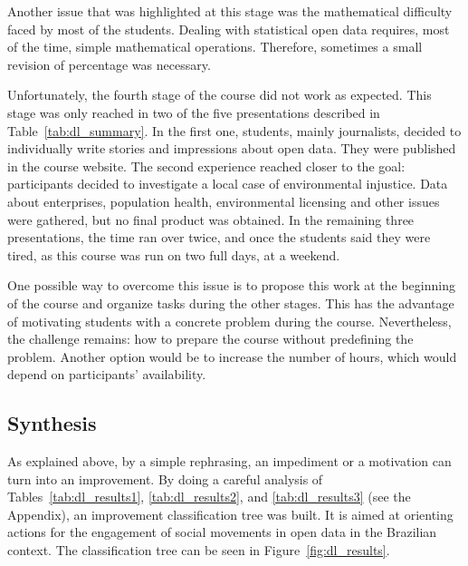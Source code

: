Another issue that was highlighted at this stage was the mathematical difficulty faced by most of the students. Dealing with statistical open data requires, most of the time, simple mathematical operations. Therefore, sometimes a small revision of percentage was necessary.

Unfortunately, the fourth stage of the course did not work as expected. This stage was only reached in two of the five presentations described in Table~\ref{tab:dl_summary}. In the first one, students, mainly journalists, decided to individually write stories and impressions about open data. They were published in the course website. The second experience reached closer to the goal: participants decided to investigate a local case of environmental injustice. Data about enterprises, population health, environmental licensing and other issues were gathered, but no final product was obtained. In the remaining three presentations, the time ran over twice, and once the students said they were tired, as this course was run on two full days, at a weekend.

One possible way to overcome this issue is to propose this work at the beginning of the course and organize tasks during the other stages. This has the advantage of motivating students with a concrete problem during the course. Nevertheless, the challenge remains: how to prepare the course without predefining the problem. Another option would be to increase the number of hours, which would depend on participants' availability.

\subsection{Synthesis}

As explained above, by a simple rephrasing, an impediment or a motivation can turn into an improvement. By doing a careful analysis of Tables~\ref{tab:dl_results1}, \ref{tab:dl_results2}, and \ref{tab:dl_results3} (see the Appendix), an improvement classification tree was built. It is aimed at orienting actions for the engagement of social movements in open data in the Brazilian context. The classification tree can be seen in Figure~\ref{fig:dl_results}.


